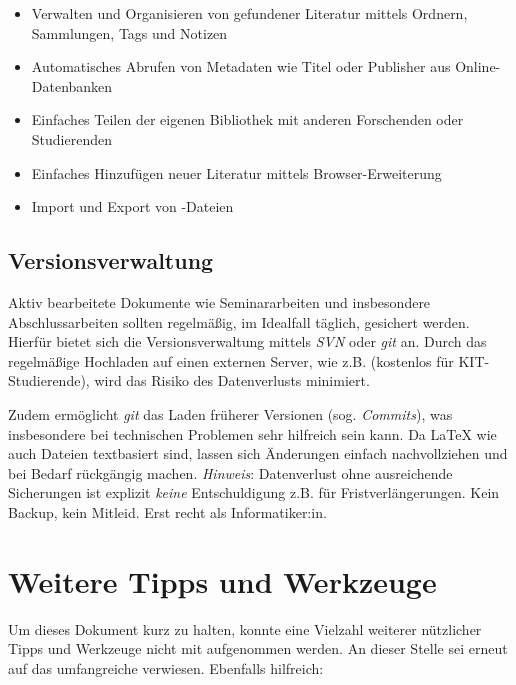 \smallskip
\begin{itemize}
    \item Verwalten und Organisieren von gefundener Literatur mittels Ordnern, Sammlungen, Tags und Notizen
    \item Automatisches Abrufen von Metadaten wie Titel oder Publisher aus Online-Datenbanken
    \item Einfaches Teilen der eigenen Bibliothek mit anderen Forschenden oder Studierenden
    \item Einfaches Hinzufügen neuer Literatur mittels Browser-Erweiterung
    \item Import und Export von \bibtex-Dateien
\end{itemize}

\subsection{Versionsverwaltung}%
\label{sec:Verwalten:Version}

Aktiv bearbeitete Dokumente wie Seminararbeiten und insbesondere Abschlussarbeiten sollten regelmäßig, im Idealfall täglich, gesichert werden.
Hierfür bietet sich die Versionsverwaltung mittels \emph{SVN} oder \emph{git} an.
Durch das regelmäßige Hochladen auf einen externen Server, wie z.B.  (kostenlos für KIT-Studierende), wird das Risiko des Datenverlusts minimiert.

Zudem ermöglicht \emph{git} das Laden früherer Versionen (sog. \emph{Commits}), was insbesondere bei technischen Problemen sehr hilfreich sein kann.
Da \LaTeX\- wie auch \bibtex\-Dateien textbasiert sind, lassen sich Änderungen einfach nachvollziehen und bei Bedarf rückgängig machen.
\emph{Hinweis}: Datenverlust ohne ausreichende Sicherungen ist explizit \emph{keine} Entschuldigung z.B. für Fristverlängerungen.
Kein Backup, kein Mitleid.
Erst recht als Informatiker:in.

\section{Weitere Tipps und Werkzeuge}%
\label{sec:Tipps}

Um dieses Dokument kurz zu halten, konnte eine Vielzahl weiterer nützlicher Tipps und Werkzeuge nicht mit aufgenommen werden. 
An dieser Stelle sei erneut auf das umfangreiche  verwiesen. 
Ebenfalls hilfreich:

